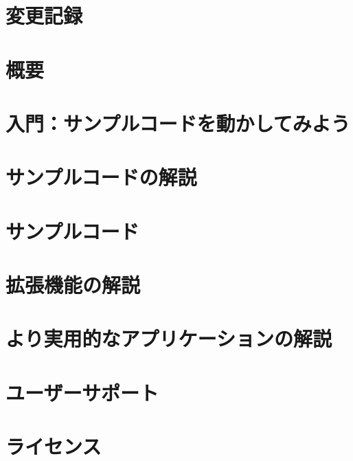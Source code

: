 \documentclass[12pt,a4paper,dvipdfmx]{jarticle} %
\title{\docTitle}
\author{行方大輔}
\author{岩澤全規}
\author{似鳥啓吾}
\author{谷川衝}
\author{村主崇行}
\author{Long Wang}
\author{細野七月}
\author{野村昴太郎}
\author{牧野淳一郎}
\affil{\affiliation}
\date{}
\begin{document}
\maketitle
\tableofcontents

\clearpage

\section{変更記録}
\label{sec:changelog}

\clearpage

\section{概要}
\label{sec:overview}

\clearpage

\section{入門：サンプルコードを動かしてみよう}
\label{sec:getting_started}

\clearpage

\section{サンプルコードの解説}
\label{sec:how_to_use}

\clearpage

\section{サンプルコード}
\label{sec:samplecode}

\clearpage

\section{拡張機能の解説}
\label{sec:extension}

\clearpage

\section{より実用的なアプリケーションの解説}
\label{sec:applications}

\clearpage


\section{ユーザーサポート}
\label{sec:usersupport}

\clearpage

\section{ライセンス}
\label{sec:license}

\end{document}
